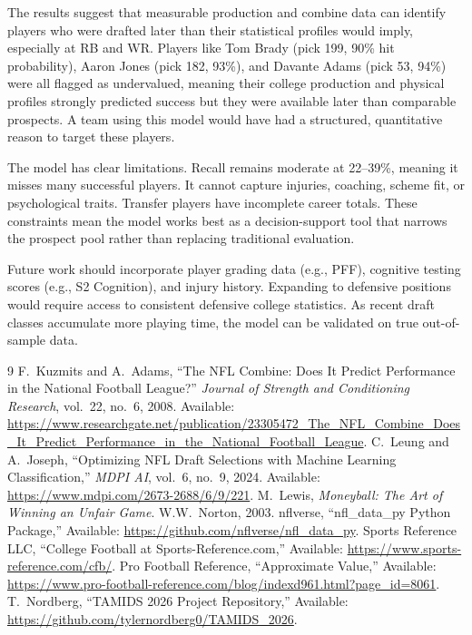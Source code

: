 \documentclass[10pt,twocolumn]{article}
\begin{document}
The results suggest that measurable production and combine data can identify players who were drafted later than their statistical profiles would imply, especially at RB and WR. Players like Tom Brady (pick 199, 90\% hit probability), Aaron Jones (pick 182, 93\%), and Davante Adams (pick 53, 94\%) were all flagged as undervalued, meaning their college production and physical profiles strongly predicted success but they were available later than comparable prospects. A team using this model would have had a structured, quantitative reason to target these players.

The model has clear limitations. Recall remains moderate at 22--39\%, meaning it misses many successful players. It cannot capture injuries, coaching, scheme fit, or psychological traits. Transfer players have incomplete career totals. These constraints mean the model works best as a decision-support tool that narrows the prospect pool rather than replacing traditional evaluation.

Future work should incorporate player grading data (e.g., PFF), cognitive testing scores (e.g., S2 Cognition), and injury history. Expanding to defensive positions would require access to consistent defensive college statistics. As recent draft classes accumulate more playing time, the model can be validated on true out-of-sample data.

\newpage
\begin{thebibliography}{9}
\small
{}
F.~Kuzmits and A.~Adams,
``The NFL Combine: Does It Predict Performance in the National Football League?''
\textit{Journal of Strength and Conditioning Research}, vol.~22, no.~6, 2008.
Available: \url{https://www.researchgate.net/publication/23305472_The_NFL_Combine_Does_It_Predict_Performance_in_the_National_Football_League}.
C.~Leung and A.~Joseph,
``Optimizing NFL Draft Selections with Machine Learning Classification,''
\textit{MDPI AI}, vol.~6, no.~9, 2024.
Available: \url{https://www.mdpi.com/2673-2688/6/9/221}.
M.~Lewis,
\textit{Moneyball: The Art of Winning an Unfair Game}.
W.W.~Norton, 2003.
nflverse,
``nfl\_data\_py Python Package,''
Available: \url{https://github.com/nflverse/nfl_data_py}.
Sports Reference LLC,
``College Football at Sports-Reference.com,''
Available: \url{https://www.sports-reference.com/cfb/}.
Pro Football Reference,
``Approximate Value,''
Available: \url{https://www.pro-football-reference.com/blog/indexd961.html?page_id=8061}.
T.~Nordberg,
``TAMIDS 2026 Project Repository,''
Available: \url{https://github.com/tylernordberg0/TAMIDS_2026}.
\end{thebibliography}
\end{document}
